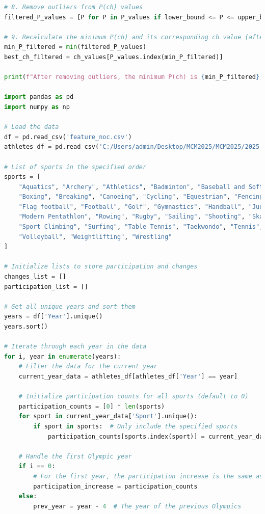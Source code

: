 \documentclass[12pt]{article}
\begin{document}
\begin{lstlisting}[language=Python, style=mystyle, caption=data\_analyze.ipynb]
# 8. Remove outliers from P(ch) values
filtered_P_values = [P for P in P_values if lower_bound <= P <= upper_bound]

# 9. Recalculate the minimum P(ch) and its corresponding ch value (after removing outliers)
min_P_filtered = min(filtered_P_values)
best_ch_filtered = ch_values[P_values.index(min_P_filtered)]

print(f"After removing outliers, the minimum P(ch) is {min_P_filtered}, corresponding to ch value {best_ch_filtered}")

import pandas as pd
import numpy as np

# Load the data
df = pd.read_csv('feature_noc.csv')
athletes_df = pd.read_csv('C:/Users/admin/Desktop/MCM2025/MCM2025/2025_Problem_C_Data/summerOly_athletes_completed.csv')

# List of sports in the specified order
sports = [
    "Aquatics", "Archery", "Athletics", "Badminton", "Baseball and Softball", "Basketball", 
    "Boxing", "Breaking", "Canoeing", "Cycling", "Equestrian", "Fencing", "Field hockey", 
    "Flag football", "Football", "Golf", "Gymnastics", "Handball", "Judo", "Karate", 
    "Modern Pentathlon", "Rowing", "Rugby", "Sailing", "Shooting", "Skateboarding", 
    "Sport Climbing", "Surfing", "Table Tennis", "Taekwondo", "Tennis", "Triathlon", 
    "Volleyball", "Weightlifting", "Wrestling"
]

# Initialize lists to store participation and changes
changes_list = []
participation_list = []

# Get all unique years and sort them
years = df['Year'].unique()
years.sort()

# Iterate through each year in the data
for i, year in enumerate(years):
    # Filter the data for the current year
    current_year_data = athletes_df[athletes_df['Year'] == year]
    
    # Initialize participation counts for all sports (default to 0)
    participation_counts = [0] * len(sports)
    for sport in current_year_data['Sport'].unique():
        if sport in sports:  # Only include the specified sports
            participation_counts[sports.index(sport)] = current_year_data[current_year_data['Sport'] == sport].shape[0]

    # Handle the first Olympic year
    if i == 0:
        # For the first year, the participation increase is the same as participation counts (no prior data)
        participation_increase = participation_counts
    else:
        prev_year = year - 4  # The year of the previous Olympics
        

\end{lstlisting}
\end{document}
